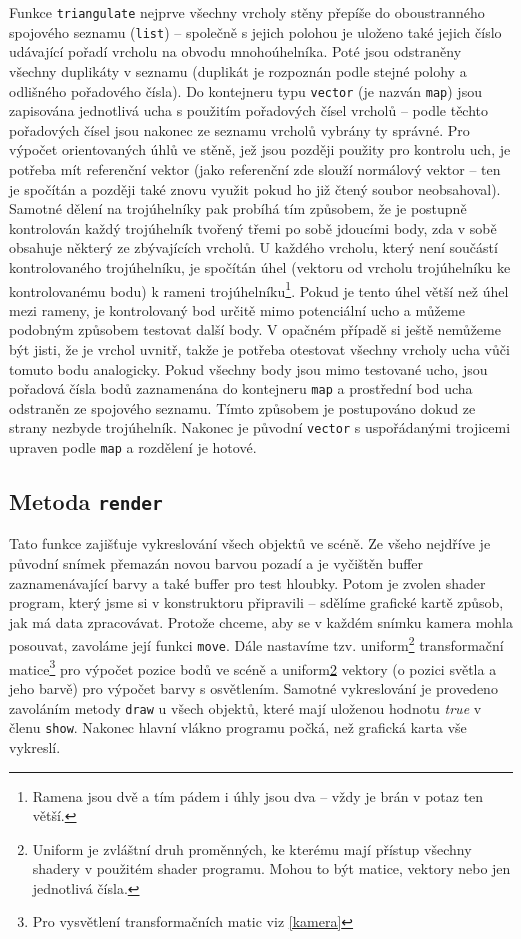 \documentclass[a4paper, 11pt]{report}
\begin{document}
Funkce \texttt{triangulate} nejprve všechny vrcholy stěny přepíše do oboustranného spojového seznamu (\texttt{list}) -- společně s jejich polohou je uloženo také jejich číslo udávající pořadí vrcholu na obvodu mnohoúhelníka. Poté jsou odstraněny všechny duplikáty v seznamu (duplikát je rozpoznán podle stejné polohy a odlišného pořadového čísla). Do kontejneru typu \texttt{vector} (je nazván \texttt{map}) jsou zapisována jednotlivá ucha s použitím pořadových čísel vrcholů -- podle těchto pořadových čísel jsou nakonec ze seznamu vrcholů vybrány ty správné. Pro výpočet orientovaných úhlů ve stěně, jež jsou později použity pro kontrolu uch, je potřeba mít referenční vektor (jako referenční zde slouží normálový vektor -- ten je spočítán a později také znovu využit pokud ho již čtený soubor neobsahoval). Samotné dělení na trojúhelníky pak probíhá tím způsobem, že je postupně kontrolován každý trojúhelník tvořený třemi po sobě jdoucími body, zda v sobě obsahuje některý ze zbývajících vrcholů. U každého vrcholu, který není součástí kontrolovaného trojúhelníku, je spočítán úhel (vektoru od vrcholu trojúhelníku ke kontrolovanému bodu) k rameni trojúhelníku\footnote{Ramena jsou dvě a tím pádem i úhly jsou dva -- vždy je brán v potaz ten větší.}. Pokud je tento úhel větší než úhel mezi rameny, je kontrolovaný bod určitě mimo potenciální ucho a můžeme podobným způsobem testovat další body. V opačném případě si ještě nemůžeme být jisti, že je vrchol uvnitř, takže je potřeba otestovat všechny vrcholy ucha vůči tomuto bodu analogicky. Pokud všechny body jsou mimo testované ucho, jsou pořadová čísla bodů zaznamenána do kontejneru \texttt{map} a prostřední bod ucha odstraněn ze spojového seznamu. Tímto způsobem je postupováno dokud ze strany nezbyde trojúhelník. Nakonec je původní \texttt{vector} s uspořádanými trojicemi upraven podle \texttt{map} a rozdělení je hotové.

\subsection{Metoda \texttt{render}}
Tato funkce zajišťuje vykreslování všech objektů ve scéně. Ze všeho nejdříve je původní snímek přemazán novou barvou pozadí a je vyčištěn buffer zaznamenávající barvy a také buffer pro test hloubky. Potom je zvolen shader program, který jsme si v konstruktoru připravili -- sdělíme grafické kartě způsob, jak má data zpracovávat. Protože chceme, aby se v každém snímku kamera mohla posouvat, zavoláme její funkci \texttt{move}. Dále nastavíme tzv. uniform\footnote{\label{uniform}Uniform je zvláštní druh proměnných, ke kterému mají přístup všechny shadery v použitém shader programu. Mohou to být matice, vektory nebo jen jednotlivá čísla.} transformační matice\footnote{Pro vysvětlení transformačních matic viz \ref{kamera}} pro výpočet pozice bodů ve scéně a uniform\cref{uniform} vektory (o pozici světla a jeho barvě) pro výpočet barvy s osvětlením. Samotné vykreslování je provedeno zavoláním metody \texttt{draw} u všech objektů, které mají uloženou hodnotu \emph{true} v členu \texttt{show}. Nakonec hlavní vlákno programu počká, než grafická karta vše vykreslí.
\end{document}
